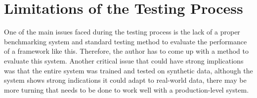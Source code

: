 \section{Limitations of the Testing Process}

One of the main issues faced during the testing process is the lack of a proper benchmarking system and standard testing method to evaluate the performance of a framework like this. Therefore, the author has to come up with a method to evaluate this system. Another critical issue that could have strong implications was that the entire system was trained and tested on synthetic data, although the system shows strong indications it could adapt to real-world data, there may be more turning that needs to be done to work well with a production-level system.